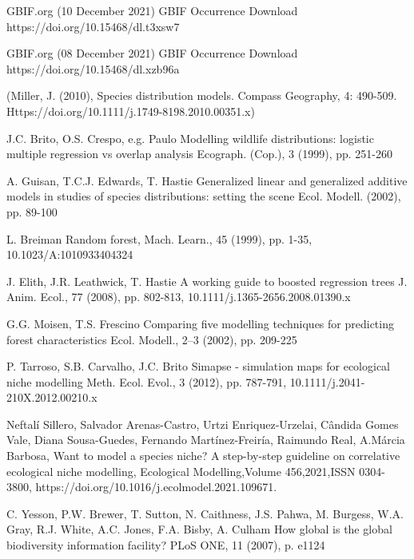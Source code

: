 \documentclass[12pt,a4paper]{article}
\begin{document}
\begin{thebibliography}{999}
GBIF.org (10 December 2021) GBIF Occurrence Download  https://doi.org/10.15468/dl.t3xsw7

GBIF.org (08 December 2021) GBIF Occurrence Download  https://doi.org/10.15468/dl.xzb96a

(Miller, J. (2010), Species distribution models. Compass Geography, 4: 490-509. Https://doi.org/10.1111/j.1749-8198.2010.00351.x)

J.C. Brito, O.S. Crespo, e.g. Paulo
Modelling wildlife distributions: logistic multiple regression vs overlap analysis
Ecograph. (Cop.), 3 (1999), pp. 251-260

A. Guisan, T.C.J. Edwards, T. Hastie
Generalized linear and generalized additive models in studies of species distributions: setting the scene
Ecol. Modell. (2002), pp. 89-100

L. Breiman
Random forest, Mach. Learn., 45 (1999), pp. 1-35, 10.1023/A:1010933404324

J. Elith, J.R. Leathwick, T. Hastie
A working guide to boosted regression trees
J. Anim. Ecol., 77 (2008), pp. 802-813, 10.1111/j.1365-2656.2008.01390.x

G.G. Moisen, T.S. Frescino
Comparing five modelling techniques for predicting forest characteristics
Ecol. Modell., 2–3 (2002), pp. 209-225

P. Tarroso, S.B. Carvalho, J.C. Brito
Simapse - simulation maps for ecological niche modelling
Meth. Ecol. Evol., 3 (2012), pp. 787-791, 10.1111/j.2041-210X.2012.00210.x

Neftalí Sillero, Salvador Arenas-Castro, Urtzi Enriquez‐Urzelai, Cândida Gomes Vale, Diana Sousa-Guedes, Fernando Martínez-Freiría, Raimundo Real, A.Márcia Barbosa,
Want to model a species niche? A step-by-step guideline on correlative ecological niche modelling,
Ecological Modelling,Volume 456,2021,ISSN 0304-3800, https://doi.org/10.1016/j.ecolmodel.2021.109671.

C. Yesson, P.W. Brewer, T. Sutton, N. Caithness, J.S. Pahwa, M. Burgess, W.A. Gray, R.J. White, A.C. Jones, F.A. Bisby, A. Culham
How global is the global biodiversity information facility?
PLoS ONE, 11 (2007), p. e1124


\end{thebibliography}
\end{document}
